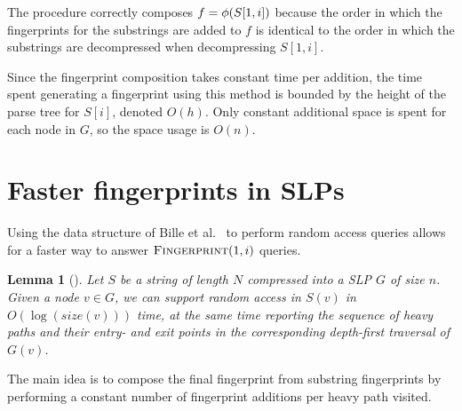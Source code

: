 \documentclass[11pt]{article}
\newtheorem{lemma}{Lemma}
\newcommand{\fingerprintq}{\ensuremath{\textsc{Fingerprint}}}
\newcommand{\fp}{\ensuremath\phi}
\newcommand{\size}{\ensuremath{\mathit{size}}}
\newcommand{\slp}{\ensuremath{G} }
\begin{document}
The procedure correctly composes $f = \fp(S[1, i])$ because the order in which the fingerprints for the substrings are added to $f$ is identical to the order in which the substrings are decompressed when decompressing $S[1, i]$. 

Since the fingerprint composition takes constant time per addition, the time spent generating a fingerprint using this method is bounded by the height of the parse tree for $S[i]$, denoted $O(h)$. Only constant additional space is spent for each node in $\slp$, so the space usage is $O(n)$.

\section{Faster fingerprints in SLPs}
Using the data structure of Bille et al.~\cite{bille2011random} to perform random access queries allows for a faster way to answer $\fingerprintq(1, i)$ queries.



\begin{lemma}[\cite{bille2011random}]\label{lem:slp:random}
Let $S$ be a string of length $N$ compressed into a SLP $\slp$ of size $n$. Given a node $v \in \slp$, we can support random access in $S(v)$ in $O(\log (\size(v)))$ time, at the same time reporting the sequence of heavy paths and their entry- and exit points in the corresponding depth-first traversal of $\slp(v)$.
\end{lemma}

\noindent The main idea is to compose the final fingerprint from substring fingerprints by performing a constant number of fingerprint additions per heavy path visited.
\end{document}
